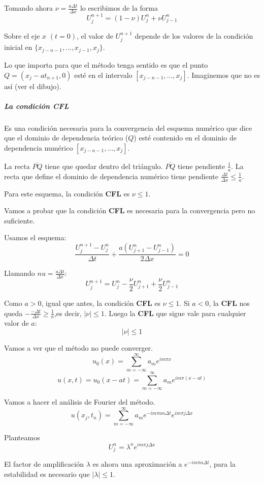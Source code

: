 Tomando ahora $\nu =\frac{a\Delta t}{\Delta x}$ lo escribimos de la forma
$$U_{j}^{n+1} = (1-\nu)U_{j}^{n}+\nu U_{j-1}^{n}$$

Sobre el eje $x$ $(t=0)$, el valor de $U_{j}^{n+1}$ depende de los valores de la condición inicial en $\{x_{j-n-1},\hdots,x_{j-1},x_j\}$.

Lo que importa para que el método tenga sentido es que el punto $Q=(x_j-at_{n+1}, 0)$ esté en el intervalo $\left[x_{j-n-1},\hdots,x_j\right]$. Imaginemos que no es así (ver el dibujo).

\subparagraph*{La condición CFL} Es una condición necesaria para la convergencia del esquema numérico que dice que el dominio de dependencia teórico ($Q$) esté contenido en el dominio de dependencia numérico $\left[x_{j-n-1},\hdots,x_j\right]$.

La recta $\overline{PQ}$ tiene que quedar dentro del triángulo. $\overline{PQ}$ tiene pendiente $\frac{1}{a}$. La recta que define el dominio de dependencia numérico tiene pendiente $\frac{\Delta t}{\Delta x}\le \frac{1}{a}$.

Para este esquema, la condición \textbf{CFL} es $\nu\le1$.

Vamos a probar que la condición \textbf{CFL} es necesaria para la convergencia pero no suficiente.

Usamos el esquema:
$$\frac{U_{j}^{n+1}-U_{j}^{n}}{\Delta t} + \frac{a(U_{j+1}^{n}-U_{j-1}^{n})}{2\Delta x} = 0$$

Llamando $nu=\frac{a\Delta t}{\Delta x}$:
$$U_{j}^{n+1}=U_{j}^{n}-\frac{\nu}{2}U_{j+1}^{n}+\frac{\nu}{2}U_{j-1}^{n}$$

Como $a>0$, igual que antes, la condición \textbf{CFL} es $\nu\le1$. Si $a<0$, la \textbf{CFL} nos queda $-\frac{-\Delta t}{\Delta x} \ge \frac{1}{a}$,es decir, $|\nu| \le 1$. Luego la \textbf{CFL} que sigue vale para cualquier valor de $a$:
$$|\nu|\le 1$$

Vamos a ver que el método no puede converger.
$$u_0(x) = \sum_{m=-\infty}^\infty a_m e^{im\pi x}$$
$$u(x,t) = u_0(x-at) =  \sum_{m=-\infty}^\infty a_m e^{im\pi (x-at)}$$

Vamos a hacer el análisis de Fourier del método.
$$u(x_j,t_n) = \sum_{m=-\infty}^\infty a_me^{-im\pi a n \Delta t}e^{im\pi j\Delta x}$$

Planteamos
$$U_j^n = \lambda^n e^{im\pi j\Delta x}$$

El factor de amplificación $\lambda$ es ahora una aproximación a $e^{-im\pi a\Delta t}$, para la estabilidad es necesario que $|\lambda| \le 1$.

